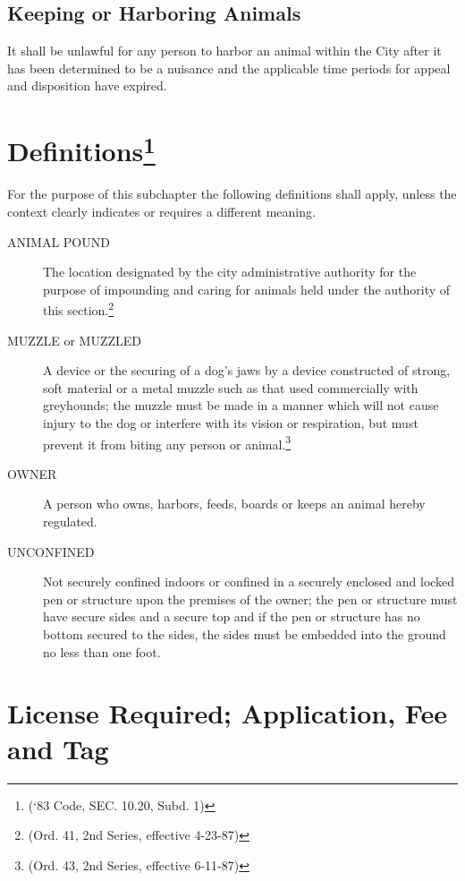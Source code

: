 \subsection{Keeping or Harboring Animals}
It shall be unlawful for any person to harbor an animal within the City after it has been determined to be a nuisance and the applicable time periods for appeal and disposition have expired.\\


\setcounter{section}{14}
\section{Definitions\footnote{(‘83 Code, SEC. 10.20, Subd. 1)}}
For the purpose of this subchapter the following definitions shall apply, unless the context clearly indicates or requires a different meaning.
\begin{description}
    \item[ANIMAL POUND] The location designated by the city administrative authority for the purpose of impounding and caring for animals held under the authority of this section.\footnote{(Ord. 41, 2nd Series, effective 4-23-87)}
    \item[MUZZLE or MUZZLED] A device or the securing of a dog’s jaws by a device constructed of strong, soft material or a metal muzzle such as that used commercially with greyhounds; the muzzle must be made in a manner which will not cause injury to the dog or interfere with its vision or respiration, but must prevent it from biting any person or animal.\footnote{(Ord. 43, 2nd Series, effective 6-11-87)}
    \item[OWNER] A person who owns, harbors, feeds, boards or keeps an animal hereby regulated.
    \item[UNCONFINED] Not securely confined indoors or confined in a securely enclosed and locked pen or structure upon the premises of the owner; the pen or structure must have secure sides and a secure top and if the pen or structure has no bottom secured to the sides, the sides must be embedded into the ground no less than one foot.
\end{description}

\section{License Required; Application, Fee and Tag}
